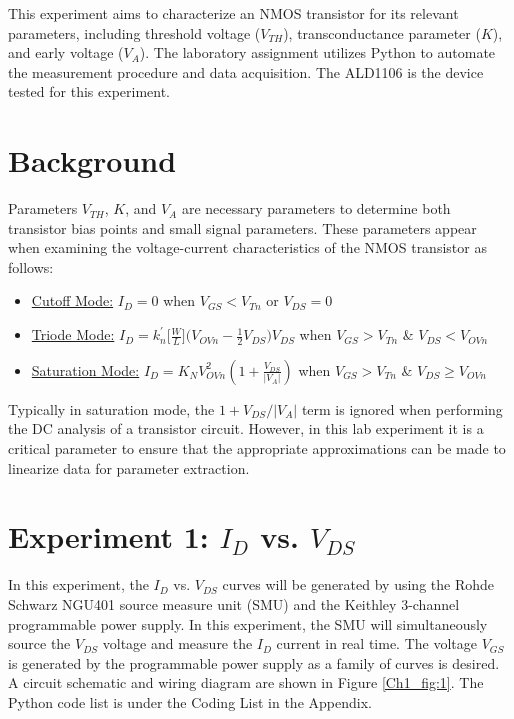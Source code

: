 
\onehalfspacing
\justifying
\par
This experiment aims to characterize an NMOS transistor for its relevant parameters, including threshold voltage ($V_{TH}$), transconductance parameter ($K$), and early voltage ($V_{A}$). The laboratory assignment utilizes Python to automate the measurement procedure and data acquisition. The ALD1106 is the device tested for this experiment.  

\section{Background}

Parameters $V_{TH}$, $K$, and $V_{A}$ are necessary parameters to determine both transistor bias points and small signal parameters. These parameters appear when examining the voltage-current characteristics of the NMOS transistor as follows:
\vspace{0.2cm}
\begin{itemize}
    \item \underline{Cutoff Mode:} $I_{D} = 0$ when $V_{GS} < V_{Tn}$ or $V_{DS}=0$
    
    \item \underline{Triode Mode:} $I_{D} = k_{n}^{'}\displaystyle \Bigg[\frac{W} {L}\Bigg]\Bigg(V_{OVn}-\frac{1}{2}V_{DS}\Bigg)V_{DS}$ when $V_{GS} > V_{Tn}$ \& $V_{DS}<V_{OVn}$
    
    \item \underline{Saturation Mode:} $I_{D} = K_{N}V_{OVn}^2\left(1+\displaystyle\frac{V_{DS}}{|V_{A}|}\right)$ when $V_{GS} > V_{Tn}$ \& $V_{DS}\geq V_{OVn}$ 
\end{itemize}
\vspace{0.2cm}
Typically in saturation mode, the $1+V_{DS}/|V_{A}|$ term is ignored when performing the DC analysis of a transistor circuit. However, in this lab experiment it is a critical parameter to ensure that the appropriate approximations can be made to linearize data for parameter extraction. 

\section{Experiment 1: \texorpdfstring{$I_{D}$ vs. $V_{DS}$}{ID vs. VDS}}
In this experiment, the $I_{D}$ vs. $V_{DS}$ curves will be generated by using the Rohde Schwarz NGU401 source measure unit (SMU) and the Keithley 3-channel programmable power supply. In this experiment, the SMU will simultaneously source the $V_{DS}$ voltage and measure the $I_{D}$ current in real time. The voltage $V_{GS}$ is generated by the programmable power supply as a family of curves is desired. A circuit schematic and wiring diagram are shown in Figure \ref{Ch1_fig:1}. The Python code list is under the Coding List in the Appendix. 

